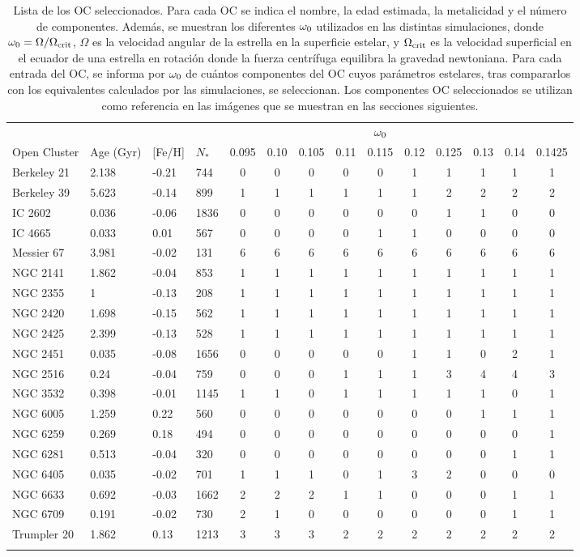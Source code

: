 \begin{longtable}[c]{|l l l l || c c c c c c c c c c|}
	\hline
	& & & & & & & & $\omega_{\mathrm{0}}$ & & & & & \\
	Open Cluster & Age (Gyr) & [Fe/H] & $N_*$ & 0.095 & 0.10 & 0.105 & 0.11 & 0.115 & 0.12 & 0.125 & 0.13 & 0.14 & 0.1425\\
	\hline
	Berkeley 21 & 2.138 & -0.21 & 744 & 0 & 0 & 0 & 0 & 0 & 1 & 1 & 1 & 1 & 1\\
	Berkeley 39 & 5.623 & -0.14 & 899 & 1 & 1 & 1 & 1 & 1 & 1 & 2 & 2 & 2 & 2\\
	IC 2602 & 0.036 & -0.06 & 1836 & 0 & 0 & 0 & 0 & 0 & 0 & 1 & 1 & 0 & 0\\
	IC 4665 & 0.033 & 0.01 & 567 & 0 & 0 & 0 & 0 & 1 & 1 & 0 & 0 & 0 & 0\\
	Messier 67 & 3.981 & -0.02 & 131 & 6 & 6 & 6 & 6 & 6 & 6 & 6 & 6 & 6 & 6\\
	NGC 2141 & 1.862 & -0.04 & 853 & 1 & 1 & 1 & 1 & 1 & 1 & 1 & 1 & 1 & 1\\
	NGC 2355 & 1 & -0.13 & 208 & 1 & 1 & 1 & 1 & 1 & 1 & 1 & 1 & 1 & 1\\
	NGC 2420 & 1.698 & -0.15 & 562 & 1 & 1 & 1 & 1 & 1 & 1 & 1 & 1 & 1 & 1\\
	NGC 2425 & 2.399 & -0.13 & 528 & 1 & 1 & 1 & 1 & 1 & 1 & 1 & 1 & 1 & 1\\
	NGC 2451 & 0.035 & -0.08 & 1656 & 0 & 0 & 0 & 0 & 0 & 1 & 1 & 0 & 2 & 1\\
	NGC 2516 & 0.24 & -0.04 & 759 & 0 & 0 & 0 & 1 & 1 & 1 & 3 & 4 & 4 & 3\\
	NGC 3532 & 0.398 & -0.01 & 1145 & 1 & 1 & 0 & 1 & 1 & 1 & 1 & 1 & 0 & 1\\
	NGC 6005 & 1.259 & 0.22 & 560 & 0 & 0 & 0 & 0 & 0 & 0 & 0 & 1 & 1 & 1\\
	NGC 6259 & 0.269 & 0.18 & 494 & 0 & 0 & 0 & 0 & 0 & 0 & 0 & 0 & 0 & 1\\
	NGC 6281 & 0.513 & -0.04 & 320 & 0 & 0 & 0 & 0 & 0 & 0 & 0 & 0 & 1 & 1\\
	NGC 6405 & 0.035 & -0.02 & 701 & 1 & 1 & 1 & 0 & 1 & 3 & 2 & 0 & 0 & 0\\
	NGC 6633 & 0.692 & -0.03 & 1662 & 2 & 2 & 2 & 1 & 1 & 0 & 0 & 0 & 1 & 1\\
	NGC 6709 & 0.191 & -0.02 & 730 & 2 & 1 & 0 & 0 & 0 & 0 & 0 & 0 & 1 & 1\\
	Trumpler 20 & 1.862 & 0.13 & 1213 & 3 & 3 & 3 & 2 & 2 & 2 & 2 & 2 & 2 & 2\\
	\hline
	\caption{Lista de los OC seleccionados. Para cada OC se indica el nombre, la edad estimada, la metalicidad y el número de componentes. Además, se muestran los diferentes $\omega_{\mathrm{0}}$ utilizados en las distintas simulaciones, donde $\omega_{\mathrm{0}} = \Omega / \Omega_{\mathrm{crit}}$, $\Omega$ es la velocidad angular de la estrella en la superficie estelar, y $\Omega_{\mathrm{crit}}$ es la velocidad superficial en el ecuador de una estrella en rotación donde la fuerza centrífuga equilibra la gravedad newtoniana. Para cada entrada del OC, se informa por $\omega_{\mathrm{0}}$ de cuántos componentes del OC cuyos parámetros estelares, tras compararlos con los equivalentes calculados por las simulaciones, se seleccionan. Los componentes OC seleccionados se utilizan como referencia en las imágenes que se muestran en las secciones siguientes.}

\end{longtable}
